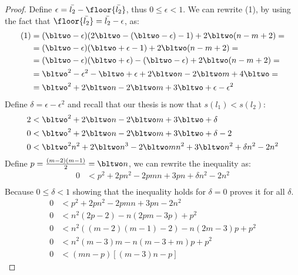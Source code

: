 \begin{proof}
	Define $\epsilon = \bar{l_2} - \floor{\bar{l_2}}$, thus $0 ≤ \epsilon < 1$. We can rewrite (1), by using the fact that $\floor{\bar{l_2}} = \bar{l_2} - \epsilon$, as:
	\begin{align*}
		(1)&= (\bltwo-\epsilon)(2\bltwo-(\bltwo-\epsilon)-1)+2\bltwo(n-m+2)=\\
		&= (\bltwo-\epsilon)(\bltwo+\epsilon-1)+2\bltwo(n-m+2)=\\
		&= (\bltwo-\epsilon)(\bltwo+\epsilon)-(\bltwo-\epsilon)+2\bltwo(n-m+2)=\\
		&= \bltwo^2-\epsilon^2-\bltwo+\epsilon+2\bltwo n-2\bltwo m+4\bltwo=\\
		&= \bltwo^2+2\bltwo n-2\bltwo m+3\bltwo+\epsilon-\epsilon^2\\
	\end{align*}
	\hfuzz=4cm
	Define $\delta=\epsilon-\epsilon^2$ and recall that our thesis is now that $s(l_1)<s(l_2)$:
	\begin{align*}
		2&< \bltwo^2+2\bltwo n-2\bltwo m+3\bltwo+\delta\\
		0&< \bltwo^2+2\bltwo n-2\bltwo m+3\bltwo+\delta-2\\
		0&< \bltwo^2 n^2+2\bltwo n^3-2\bltwo m n^2+3\bltwo n^2+\delta n^2-2 n^2\\
	\end{align*}
	Define $p=\frac{(m-2)(m-1)}{2}=\bltwo n$, we can rewrite the inequality as: 
	\begin{align*}
		0&< p^2+2p n^2-2p m n+3p n+\delta n^2-2 n^2\\
	\end{align*}
	Because $0 \leq \delta < 1$ showing that the inequality holds for $\delta=0$ proves it for all $\delta$.
	\begin{align*}
		0&< p^2+2p n^2-2p m n+3p n-2 n^2\\
		0&< n^2(2p-2)-n(2pm-3p)+p^2\\
		0&< n^2((m-2)(m-1)-2)-n(2m-3)p+p^2\\
		0&< n^2(m-3)m-n(m-3+m)p+p^2\\
		0&< (mn-p)[(m-3)n-p]
	\end{align*}

\end{proof}
